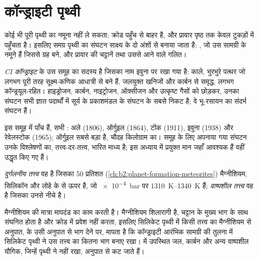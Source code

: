 \section{कॉन्ड्राइटी पृथ्वी}

कोई भी पूरी पृथ्वी का नमूना नहीं ले सकता: क्रोड पहुँच से बाहर है, और
प्रावार पृष्ठ तक केवल टुकड़ों में पहुँचता है। इसलिए समग्र पृथ्वी का संघटन
साक्ष्य के दो अंशों से बनाया जाता है: , जो उस
सामग्री के नमूने हैं जिससे ग्रह बने, और प्रावार की चट्टानें तथा उससे आने वाले
गलित।

\begin{definition}[CI कॉन्ड्राइट]\label{def:b2:elements-in-the-earth:ci}
\emph{CI कॉन्ड्राइट}  के उस समूह का
सदस्य है जिसका नाम इवुना  पर रखा गया है: काले, भुरभुरे पत्थर
जो लगभग पूरी तरह सूक्ष्म-कणिक आधात्री से बने हैं, जलयुक्त खनिजों और
कार्बन से समृद्ध, लगभग कॉन्ड्रयूल-रहित। हाइड्रोजन, कार्बन, नाइट्रोजन, ऑक्सीजन और
उत्कृष्ट गैसों को छोड़कर, उनका संघटन सभी ज्ञात पदार्थों में
सूर्य के प्रकाशमंडल के संघटन के सबसे निकट है; वे भू-रसायन का संदर्भ संघटन हैं।
\end{definition}

इस समूह में पाँच  हैं, सभी : अले (1806), ऑर्गुइल
(1864), टोंक (1911), इवुना (1938) और रेवेलस्टोक (1965); ऑर्गुइल सबसे बड़ा है,
चौदह किलोग्राम का। समूह के लिए अपनाया गया संघटन उनके विश्लेषणों का, तत्त्व-दर-तत्त्व,
भारित माध्य है; इस अध्याय में प्रयुक्त मान
जहाँ आवश्यक हैं वहीं उद्धृत किए गए हैं।

\begin{definition}[दुर्गलनीय और वाष्पशील तत्त्व]
\label{def:b2:elements-in-the-earth:volatility}
\emph{दुर्गलनीय तत्त्व} वह है जिसका 50 प्रतिशत
 (\cref{ch:b2:planet-formation-meteorites})
मैग्नीशियम, सिलिकॉन और लोहे के  से ऊपर है, जो \qty{e-4}{bar} पर \qtyrange{1310}{1340}{K}
हैं; \emph{वाष्पशील
तत्त्व} वह है जिसका  उनसे नीचे है।
\end{definition}

मैग्नीशियम की मात्रा मापदंड का काम करती है। मैग्नीशियम शिलारागी है, चट्टान के
मुख्य भाग के साथ संघनित होता है और क्रोड में प्रवेश नहीं करता, इसलिए सिलिकेट पृथ्वी में
किसी तत्त्व का मैग्नीशियम से अनुपात,  के उसी अनुपात से भाग देने पर,
मापता है कि कॉन्ड्राइटी आरंभिक सामग्री की तुलना में सिलिकेट पृथ्वी ने उस तत्त्व का कितना भाग
बनाए रखा।  में उपस्थित जल, कार्बन और अन्य वाष्पशील यौगिक, जिन्हें
पृथ्वी ने नहीं रखा, अनुपात से कट जाते हैं।

